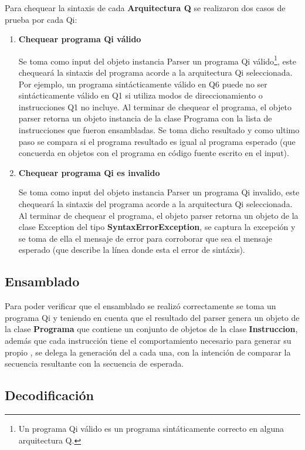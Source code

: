 Para chequear la sintaxis de cada \textbf{Arquitectura Q} se realizaron dos casos de prueba por cada Qi:
\begin{enumerate}
\item \textbf{Chequear programa Qi válido}

Se toma como input del objeto instancia Parser un programa Qi válido\footnote{Un programa Qi válido es un programa sintáticamente correcto en alguna arquitectura Q.}, este chequeará la sintaxis del programa acorde a la arquitectura Qi seleccionada. Por ejemplo, un programa sintácticamente válido en Q6 puede no ser sintácticamente válido en Q1 si utiliza modos de direccionamiento o instrucciones Q1 no incluye. Al terminar de chequear el programa, el objeto parser retorna un objeto instancia de la clase Programa con la lista de instrucciones que fueron ensambladas. 
Se toma dicho resultado y como ultimo paso se compara si el programa resultado es igual al programa esperado (que concuerda en objetos con el programa en código fuente escrito en el input).


\item \textbf{Chequear programa Qi es invalido} 

Se toma como input del objeto instancia Parser un programa Qi invalido, este chequeará la sintaxis del programa acorde a la arquitectura Qi seleccionada. Al terminar de chequear el programa, el objeto parser retorna un objeto de la clase Exception del tipo \textbf{SyntaxErrorException}, se captura la excepción y se toma de ella el mensaje de error para corroborar que sea el mensaje esperado (que describe la línea donde esta el error de sintáxis).

\end{enumerate}
\subsection{Ensamblado}

Para poder verificar que el ensamblado se realizó correctamente se toma un programa Qi y teniendo en cuenta que el resultado del parser genera un objeto de la clase \textbf{Programa} que contiene un conjunto de objetos de la clase \textbf{Instruccion}, además que cada instrucción tiene el comportamiento necesario para generar su propio \codmaq, se delega la generación del \codmaq a cada una, con la intención de comparar la secuencia resultante con la secuencia de \codmaq esperada.

\subsection{Decodificación}

